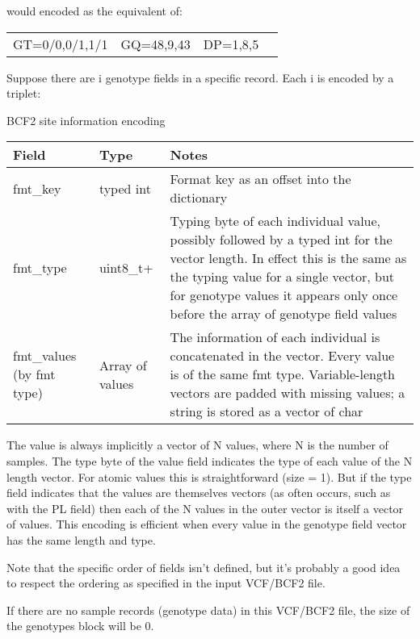 \documentclass[8pt]{article}
\begin{document}
would encoded as the equivalent of:

\vspace{0.3cm}
\begin{tabular}{l l l l}
GT=0/0,0/1,1/1 & GQ=48,9,43 & DP=1,8,5
\end{tabular}
\vspace{0.3cm}

Suppose there are i genotype fields in a specific record.  Each i is encoded by a triplet:

BCF2 site information encoding

\vspace{0.3cm}
\small
\begin{tabular}{ | p{2cm} | p{2.5cm} | p{9.5cm} | } \hline
Field & Type & Notes \\ \hline
fmt\_key & typed int & Format key as an offset into the dictionary \\ \hline
fmt\_type & uint8\_t+ & Typing byte of each individual value, possibly followed by a typed int for the vector length.  In effect this is the same as the typing value for a single vector, but for genotype values it appears only once before the array of genotype field values \\ \hline
fmt\_values	(by fmt type) & Array of values & The information of each individual is concatenated in the vector.  Every value is of the same fmt type.  Variable-length vectors are padded with missing values; a string is stored as a vector of char \\  \hline
\end{tabular}
\normalsize
\vspace{0.3cm}

The value is always implicitly a vector of N values, where N is the number of samples.  The type byte of the value field indicates the type of each value of the N length vector.  For atomic values this is straightforward (size = 1).  But if the type field indicates that the values are themselves vectors (as often occurs, such as with the PL field) then each of the N values in the outer vector is itself a vector of values.  This encoding is efficient when every value in the genotype field vector has the same length and type.

Note that the specific order of fields isn't defined, but it's probably a good idea to respect the ordering as specified in the input VCF/BCF2 file.

If there are no sample records (genotype data) in this VCF/BCF2 file, the size of the genotypes block will be 0.
\end{document}
